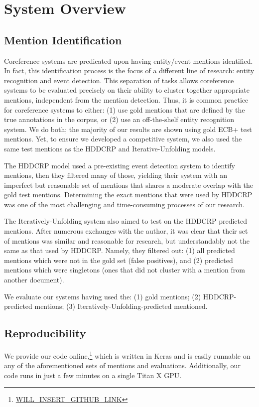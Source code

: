 \documentclass[11pt,a4paper]{article}
\begin{document}
\section{System Overview}
\subsection{Mention Identification}
\label{sec:mentionid}
Coreference systems are predicated upon having entity/event mentions identified.  In fact, this identification process is the focus of a different line of research: entity recognition and event detection.  This separation of tasks allows coreference systems to be evaluated precisely on their ability to cluster together appropriate mentions, independent from the mention detection.  Thus, it is common practice for coreference systems to either: (1) use gold mentions that are defined by the true annotations in the corpus, or (2) use an off-the-shelf entity recognition system.  We do both; the majority of our results are shown using gold ECB+ test mentions.  Yet, to ensure we developed a competitive system, we also used the same test mentions as the HDDCRP and Iterative-Unfolding models.

The HDDCRP model used a pre-existing event detection system to identify mentions, then they filtered many of those, yielding their system with an imperfect but reasonable set of mentions that shares a moderate overlap with the gold test mentions.  Determining the exact mentions that were used by HDDCRP was one of the most challenging and time-consuming processes of our research.

The Iteratively-Unfolding system also aimed to test on the HDDCRP predicted mentions.  After numerous exchanges with the author, it was clear that their set of mentions was similar and reasonable for research, but understandably not the same as that used by HDDCRP.  Namely, they filtered out: (1) all predicted mentions which were not in the gold set (false positives), and (2) predicted mentions which were singletons (ones that did not cluster with a mention from another document).

We evaluate our systems having used the: (1) gold mentions; (2) HDDCRP-predicted mentions; (3) Iteratively-Unfolding-predicted mentioned.

\subsection{Reproducibility}
We provide our code online,\footnote{\url{WILL_INSERT_GITHUB_LINK}} which is written in Keras \cite{chollet2015} and is easily runnable on any of the aforementioned sets of mentions and evaluations.  Additionally, our code runs in just a few minutes on a single Titan X GPU.
\end{document}
